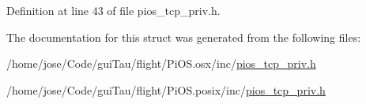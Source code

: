Definition at line 43 of file pios\-\_\-tcp\-\_\-priv.\-h.



The documentation for this struct was generated from the following files\-:\begin{DoxyCompactItemize}
\item 
/home/jose/\-Code/gui\-Tau/flight/\-Pi\-O\-S.\-osx/inc/\hyperlink{_pi_o_s_8osx_2inc_2pios__tcp__priv_8h}{pios\-\_\-tcp\-\_\-priv.\-h}\item 
/home/jose/\-Code/gui\-Tau/flight/\-Pi\-O\-S.\-posix/inc/\hyperlink{_pi_o_s_8posix_2inc_2pios__tcp__priv_8h}{pios\-\_\-tcp\-\_\-priv.\-h}\end{DoxyCompactItemize}
